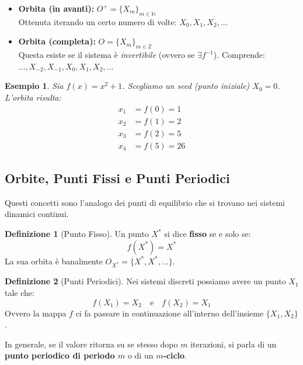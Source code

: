 \documentclass[openany]{book}
\newtheorem*{esempio}{Esempio}
\theoremstyle{definition}
\newtheorem*{definizione}{Definizione}
\theoremstyle{remark}
\begin{document}
\begin{itemize}
    \item \textbf{Orbita (in avanti):} $O^+ = \{X_m\}_{m \in \mathbb{N}}$ \\
    Ottenuta iterando un certo numero di volte: $X_0, X_1, X_2, \dots$
    
    \item \textbf{Orbita (completa):} $O = \{X_m\}_{m \in \mathbb{Z}}$ \\
    Questa esiste se il sistema è \emph{invertibile} (ovvero se $\exists f^{-1}$). Comprende: $\dots, X_{-2}, X_{-1}, X_0, X_1, X_2, \dots$
\end{itemize}

\begin{esempio}
    Sia $f(x) = x^2 + 1$. Scegliamo un \emph{seed} (punto iniziale) $X_0 = 0$. 
    L'orbita risulta:
    \begin{align*}
        x_1 &= f(0) = 1 \\
        x_2 &= f(1) = 2 \\
        x_3 &= f(2) = 5 \\
        x_4 &= f(5) = 26
    \end{align*}
\end{esempio}

\subsection{Orbite, Punti Fissi e Punti Periodici}

Questi concetti sono l'analogo dei punti di equilibrio che si trovano nei sistemi dinamici continui.

\begin{definizione}[Punto Fisso]
    Un punto $X^*$ si dice \textbf{fisso} se e solo se:
    $$ f(X^*) = X^* $$
    La sua orbita è banalmente $O_{X^*} = \{X^*, X^*, \dots\}$.
\end{definizione}

\begin{definizione}[Punti Periodici]
    Nei sistemi discreti possiamo avere un punto $X_1$ tale che:
    $$ f(X_1) = X_2 \quad \text{e} \quad f(X_2) = X_1 $$
    Ovvero la mappa $f$ ci fa passare in continuazione all'interno dell'insieme $\{X_1, X_2\}$.
    
    In generale, se il valore ritorna su se stesso dopo $m$ iterazioni, si parla di un \textbf{punto periodico di periodo $m$} o di un \textbf{$m$-ciclo}.
\end{definizione}
\end{document}
